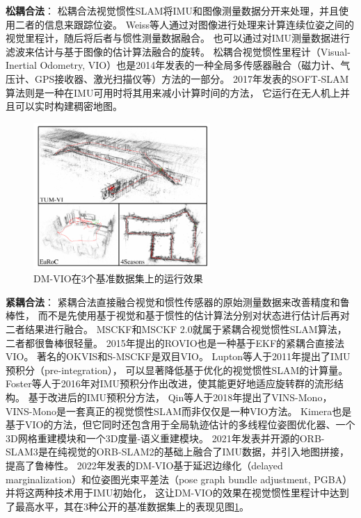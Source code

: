 \textbf{松耦合法}：
松耦合法视觉惯性SLAM将IMU和图像测量数据分开来处理，并且使用二者的信息来跟踪位姿。
Weiss等人\cite{weiss2012real}通过对图像进行处理来计算连续位姿之间的视觉里程计，随后将后者与惯性测量数据融合。
也可以通过对IMU测量数据进行滤波来估计与基于图像的估计算法融合的旋转。
松耦合视觉惯性里程计（Visual-Inertial Odometry, VIO）也是2014年发表的一种全局多传感器融合（磁力计、气压计、GPS接收器、激光扫描仪等）方法\cite{shen2014multi}的一部分。
2017年发表的SOFT-SLAM\cite{cvivsic2018soft}算法则是一种在IMU可用时将其用来减小计算时间的方法，
它运行在无人机上并且可以实时构建稠密地图。

\begin{figure}[htbp]
    \centering
    \includegraphics[width = 0.6\textwidth]{figures/dm_vio_demo.png}
    \caption{DM-VIO在3个基准数据集上的运行效果\cite{von2022dm}}
    \label{fig:dm_vio_demo}
\end{figure}

\textbf{紧耦合法}：
紧耦合法直接融合视觉和惯性传感器的原始测量数据来改善精度和鲁棒性，
而不是先使用基于视觉和基于惯性的估计算法分别对状态进行估计后再对二者结果进行融合。
MSCKF\cite{mourikis2007multi}和MSCKF 2.0\cite{li2013high}就属于紧耦合视觉惯性SLAM算法，二者都很鲁棒很轻量。
2015年提出的ROVIO\cite{bloesch2015robust}也是一种基于EKF的紧耦合直接法VIO。
著名的OKVIS\cite{leutenegger2015keyframe}和S-MSCKF\cite{sun2018robust}是双目VIO。
Lupton等人于2011年提出了IMU预积分（pre-integration）\cite{lupton2011visual}，
可以显著降低基于优化的视觉惯性SLAM的计算量。
Foster等人于2016年对IMU预积分作出改进\cite{forster2016manifold}，使其能更好地适应旋转群的流形结构。
基于改进后的IMU预积分方法，
Qin等人于2018年提出了VINS-Mono\cite{qin2018vins}，VINS-Mono是一套真正的视觉惯性SLAM而非仅仅是一种VIO方法\cite{servieres2021visual}。
Kimera\cite{rosinol2020kimera}也是基于VIO的方法，但它同时还包含用于全局轨迹估计的多线程位姿图优化器、一个3D网格重建模块和一个3D度量-语义重建模块。
2021年发表并开源的ORB-SLAM3\cite{campos2021orb}是在纯视觉的ORB-SLAM2\cite{mur2017orb}的基础上融合了IMU数据，并引入地图拼接，提高了鲁棒性。
2022年发表的DM-VIO\cite{von2022dm}基于延迟边缘化（delayed marginalization）和位姿图光束平差法（pose graph bundle adjustment, PGBA）并将这两种技术用于IMU初始化，
这让DM-VIO的效果在视觉惯性里程计中达到了最高水平，其在3种公开的基准数据集上的表现见图\ref{fig:dm_vio_demo}。

